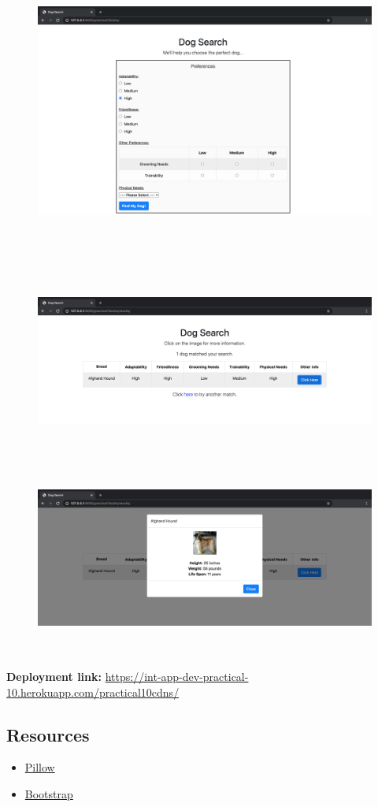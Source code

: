 \documentclass{article}
\begin{document}
\begin{figure}[H]
  \includegraphics[width=175mm, height=100mm]{./img/10-expected-dog-search-5.png}
  \includegraphics[width=175mm, height=65mm]{./img/10-expected-dog-search-6.png}
  \includegraphics[width=175mm, height=65mm]{./img/10-expected-dog-search-7.png}
\end{figure}

\textbf{Deployment link:} \href{https://int-app-dev-practical-10.herokuapp.com/practical10cdns/}{https://int-app-dev-practical-10.herokuapp.com/practical10cdns/}

\subsection*{Resources} 
\begin{itemize}
  \item \href{https://pillow.readthedocs.io/en/3.0.x/index.html}{Pillow}
  \item \href{https://getbootstrap.com/}{Bootstrap}
\end{itemize}
\end{document}
